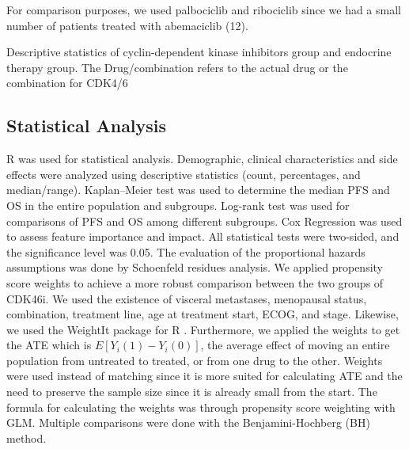 For comparison purposes, we used palbociclib and ribociclib since we had a small number of patients treated with abemaciclib (12).

 
\begin{table}
\caption{Descriptive statistics of cyclin-dependent kinase inhibitors group and endocrine therapy group. The Drug/combination refers to the actual drug or the combination for CDK4/6}
\centering
\label{tab:stats_ipop_cdk}

\end{table}




\subsection{Statistical Analysis}
R was used for statistical analysis. Demographic, clinical characteristics and side effects were analyzed using descriptive statistics (count, percentages, and median/range). Kaplan–Meier test was used to determine the median PFS and OS in the entire population and subgroups. Log-rank test was used for comparisons of PFS and OS among different subgroups. Cox Regression was used to assess feature importance and impact. All statistical tests were two-sided, and the significance level was 0.05. The evaluation of the proportional hazards assumptions was done by Schoenfeld residues analysis.
We applied propensity score weights to achieve a more robust comparison between the two groups of CDK4\/6i. We used the existence of visceral metastases, menopausal status, combination, treatment line, age at treatment start, ECOG, and stage. Likewise, we used the WeightIt package for R \cite{WeightIt}. Furthermore, we applied the weights to get the ATE which is $E[Y_i(1)-Y_i(0)]$, the average effect of moving an entire population from untreated to treated, or from one drug to the other. Weights were used instead of matching since it is more suited for calculating ATE and the need to preserve the sample size since it is already small from the start. The formula for calculating the weights was through propensity score weighting with GLM. Multiple comparisons were done with the Benjamini-Hochberg (BH) method. 




